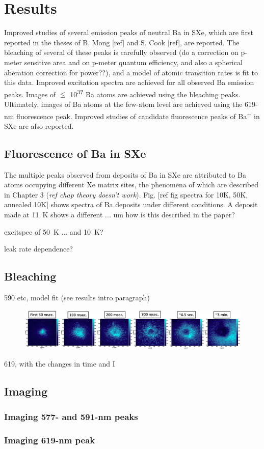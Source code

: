 \chapter{Results}

Improved studies of several emission peaks of neutral Ba in SXe, which are first reported in the theses of B. Mong [ref] and S. Cook [ref], are reported.  The bleaching of several of these peaks is carefully observed ({\color{red}do a correction on p-meter sensitive area and on p-meter quantum efficiency, and also a spherical aberation correction for power??}), and a model of atomic transition rates is fit to this data.  Improved excitation spectra are achieved for all observed Ba emission peaks.  Images of $\leq$ 10\textsuperscript{3\textbf{?}} Ba atoms are achieved using the bleaching peaks.  Ultimately, images of Ba atoms at the few-atom level are achieved using the 619-nm fluorescence peak.  Improved studies of candidate fluorescence peaks of Ba\textsuperscript{+} in SXe are also reported.  

\section{Fluorescence of Ba in SXe}

The multiple peaks observed from deposits of Ba in SXe are attributed to Ba atoms occupying different Xe matrix sites, the phenomena of which are described in Chapter 3 {\color{red}(\emph{ref chap theory doesn't work})}.  Fig. [ref fig spectra for 10K, 50K, annealed 10K] shows spectra of Ba deposits under different conditions.  A deposit made at 11~K shows a different ... um how is this described in the paper?

excitspec of 50~K ... and 10~K?

leak rate dependence?

\section{Bleaching}

590 etc, model fit (see results intro paragraph)

\begin{figure}[H]
        \centering
                \includegraphics[width=.9\textwidth]{figures/hole_bleach_590.png}
                \caption{}
\label{fig:testfig}
\end{figure}

619, with the changes in time and I

\section{Imaging}

\subsection{Imaging 577- and 591-nm peaks}

\subsection{Imaging 619-nm peak}